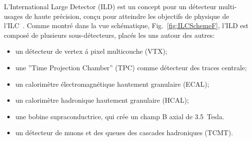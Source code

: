 L'International Large Detector (ILD) est un concept pour un détecteur multi-usages de haute précision, conçu pour atteindre les objectifs de physique de l'ILC~\cite{Behnke:2013lya}.
Comme montr\'e dans la vue schématique, Fig.~\ref {fig:ILCSchemeF}, l’ILD est compos\'e de plusieurs sous-d\'etecteurs, plac\'es les uns autour des autres:
\begin{itemize}
	\item un d\'etecteur de vertex \'a pixel multicouche (VTX);
	\item une ”Time Projection Chamber” (TPC) comme d\'etecteur des traces centrale;
	\item un calorim\`etre \'electromagn\'etique hautement granulaire (ECAL);
	\item un calorim\`etre hadronique hautement granulaire (HCAL);
	\item une bobine supraconductrice, qui cr\'ee un champ B axial de 3.5~Tesla.
	\item un d\'etecteur de muons et des queues des cascades hadroniques (TCMT).
\end{itemize}

